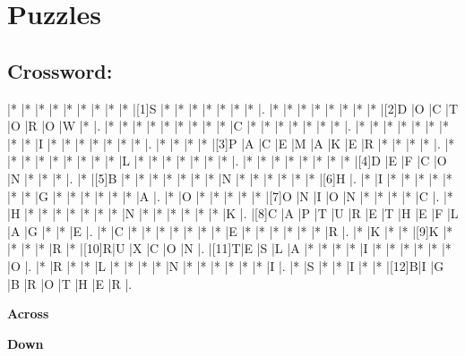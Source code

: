 \documentclass{article}
\begin{document}
\section*{Puzzles}

\subsection*{Crossword:}

\begin{Puzzle}{17}{17} %
|*    |*    |*    |*    |*    |*    |*    |*    |*    |[1]S |*    |*    |*    |*    |*    |*    |*    |.
|*    |*    |*    |*    |*    |*    |*    |*    |[2]D |O    |C    |T    |O    |R    |O    |W    |*    |.
|*    |*    |*    |*    |*    |*    |*    |*    |*    |C    |*    |*    |*    |*    |*    |*    |*    |.
|*    |*    |*    |*    |*    |*    |*    |*    |*    |I    |*    |*    |*    |*    |*    |*    |*    |.
|*    |*    |*    |*    |[3]P |A    |C    |E    |M    |A    |K    |E    |R    |*    |*    |*    |*    |.
|*    |*    |*    |*    |*    |*    |*    |*    |*    |L    |*    |*    |*    |*    |*    |*    |*    |.
|*    |*    |*    |*    |*    |*    |*    |*    |[4]D |E    |F    |C    |O    |N    |*    |*    |*    |.
|*    |[5]B |*    |*    |*    |*    |*    |*    |*    |N    |*    |*    |*    |*    |*    |*    |[6]H |.
|*    |I    |*    |*    |*    |*    |*    |*    |*    |G    |*    |*    |*    |*    |*    |*    |A    |.
|*    |O    |*    |*    |*    |*    |*    |[7]O |N    |I    |O    |N    |*    |*    |*    |*    |C    |.
|*    |H    |*    |*    |*    |*    |*    |*    |*    |N    |*    |*    |*    |*    |*    |*    |K    |.
|[8]C |A    |P    |T    |U    |R    |E    |T    |H    |E    |F    |L    |A    |G    |*    |*    |E    |.
|*    |C    |*    |*    |*    |*    |*    |*    |*    |E    |*    |*    |*    |*    |*    |*    |R    |.
|*    |K    |*    |*    |[9]K |*    |*    |*    |*    |R    |*    |[10]R|U    |X    |C    |O    |N    |.
|[11]T|E    |S    |L    |A    |*    |*    |*    |*    |I    |*    |*    |*    |*    |*    |*    |O    |.
|*    |R    |*    |*    |L    |*    |*    |*    |*    |N    |*    |*    |*    |*    |*    |*    |I    |.
|*    |S    |*    |*    |I    |*    |*    |[12]B|I    |G    |B    |R    |O    |T    |H    |E    |R    |.
\end{Puzzle}


\begin{PuzzleClues}{\textbf{Across}} %
\end{PuzzleClues} %
%
\begin{PuzzleClues}{\textbf{Down}}
\end{PuzzleClues}
\end{document}
